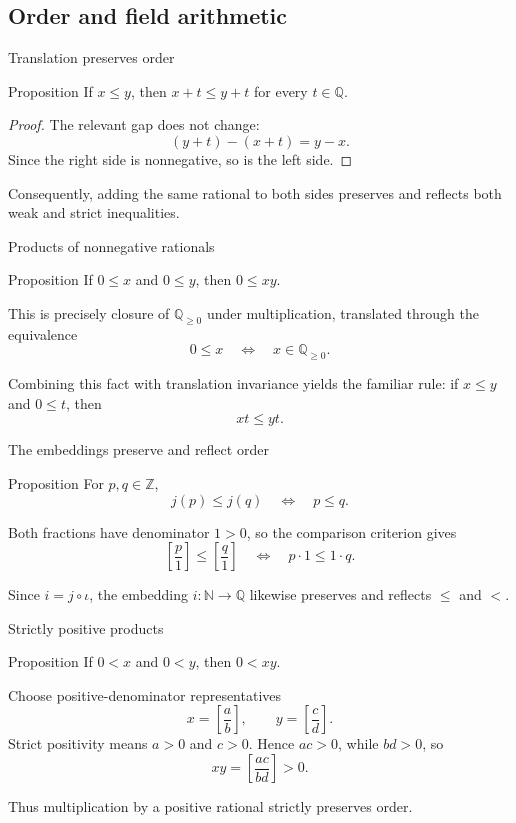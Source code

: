 \documentclass[aspectratio=169,11pt]{beamer}
\newcommand{\N}{\mathbb N}
\newcommand{\Z}{\mathbb Z}
\newcommand{\Q}{\mathbb Q}
\newcommand{\qcl}[2]{\left[\frac{#1}{#2}\right]}
\begin{document}
\subsection{Order and field arithmetic}

\begin{frame}{Translation preserves order}
  \begin{block}{Proposition}
    If \(x\le y\), then \(x+t\le y+t\) for every \(t\in\Q\).
  \end{block}

  \begin{proof}
    The relevant gap does not change:
    \[
      (y+t)-(x+t)=y-x.
    \]
    Since the right side is nonnegative, so is the left side.
  \end{proof}

  Consequently, adding the same rational to both sides preserves and reflects
  both weak and strict inequalities.
\end{frame}

\begin{frame}{Products of nonnegative rationals}
  \begin{block}{Proposition}
    If \(0\le x\) and \(0\le y\), then \(0\le xy\).
  \end{block}

  This is precisely closure of \(\Q_{\ge0}\) under multiplication, translated
  through the equivalence
  \[
    0\le x\quad\Longleftrightarrow\quad x\in\Q_{\ge0}.
  \]

  Combining this fact with translation invariance yields the familiar rule:
  if \(x\le y\) and \(0\le t\), then
  \[
    xt\le yt.
  \]
\end{frame}

\begin{frame}{The embeddings preserve and reflect order}
  \begin{block}{Proposition}
    For \(p,q\in\Z\),
    \[
      j(p)\le j(q)
      \quad\Longleftrightarrow\quad
      p\le q.
    \]
  \end{block}

  Both fractions have denominator \(1>0\), so the comparison criterion gives
  \[
    \qcl p1\le\qcl q1
      \quad\Longleftrightarrow\quad
      p\cdot1\le1\cdot q.
  \]

  Since \(i=j\circ\iota\), the embedding \(i\colon\N\to\Q\) likewise preserves
  and reflects \(\le\) and \(<\).
\end{frame}

\begin{frame}{Strictly positive products}
  \begin{block}{Proposition}
    If \(0<x\) and \(0<y\), then \(0<xy\).
  \end{block}

  Choose positive-denominator representatives
  \[
    x=\qcl ab,
    \qquad
    y=\qcl cd.
  \]
  Strict positivity means \(a>0\) and \(c>0\).  Hence \(ac>0\), while
  \(bd>0\), so
  \[
    xy=\qcl{ac}{bd}>0.
  \]

  Thus multiplication by a positive rational strictly preserves order.
\end{frame}
\end{document}
